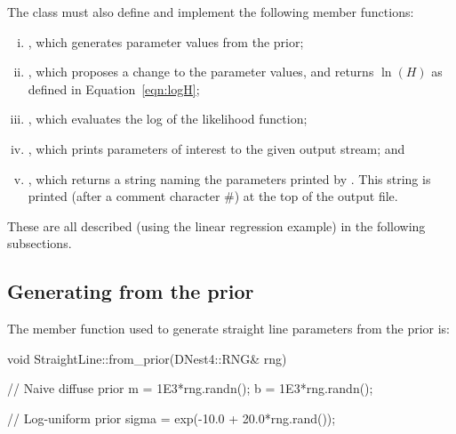 \documentclass[article, nojss]{jss}
\begin{document}
The class must also define and implement the following member functions:
\begin{enumerate}[(i)]
\item {}, which generates parameter
        values from the prior;
\item {}, which proposes a
        change to the parameter values, and returns $\ln(H)$ as defined in
        Equation~\ref{eqn:logH};
\item {}, which evaluates the log of
        the likelihood function;
\item {}, which prints parameters of
        interest to the given output stream; and
\item {}, which returns a 
        string naming the parameters printed by .
        This string is printed (after a comment character \#) at the top of
        the output file.
\end{enumerate}
These are all described (using the linear regression example) in the
following subsections.





\subsection{Generating from the prior}
The member function used to generate straight line parameters from the
prior is:
\begin{CodeChunk}
\begin{CodeInput}
void StraightLine::from_prior(DNest4::RNG& rng)
{
   // Naive diffuse prior
   m = 1E3*rng.randn();
   b = 1E3*rng.randn();

   // Log-uniform prior
   sigma = exp(-10.0 + 20.0*rng.rand());
}
\end{CodeInput}
\end{CodeChunk}
\end{document}
